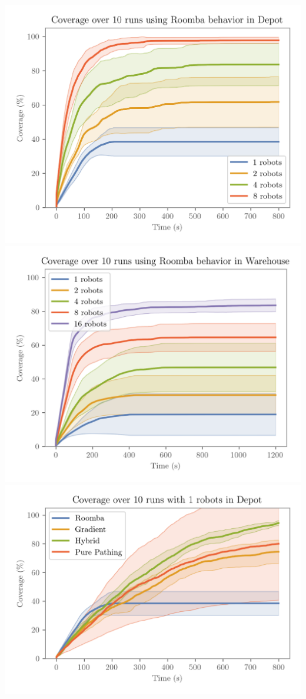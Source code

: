 \\
\includegraphics[width=\w]{figures/plots/benchmarks/coverage-over-10-runs-using-roomba-behavior-in-depot.png}
\includegraphics[width=\w]{figures/plots/benchmarks/coverage-over-10-runs-using-roomba-behavior-in-warehouse.png}
\\
\includegraphics[width=\w]{figures/plots/benchmarks/coverage-over-10-runs-with-1-robots-in-depot.png}
